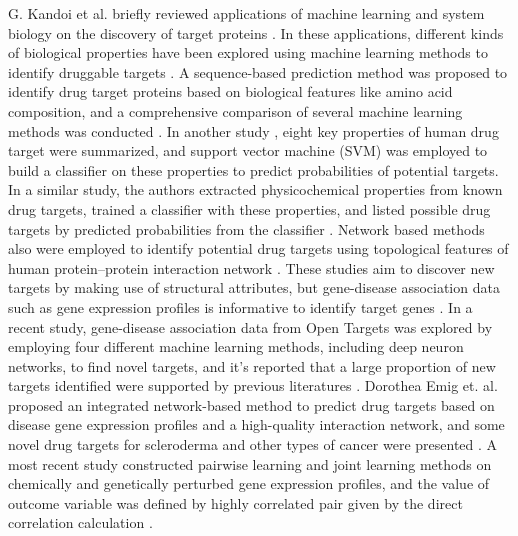     G. Kandoi et al. briefly reviewed applications of machine learning and system biology on the discovery of target proteins \cite{kandoi2015prediction}. In these applications, different kinds of biological properties have been explored using machine learning methods to identify druggable targets \cite{bakheet2009properties, fauman2011structure, li2015large,kumari2015identification, li2007prediction}. A sequence-based prediction method was proposed to identify drug target proteins based on biological features like amino acid composition, and a comprehensive comparison of several machine learning methods was conducted \cite{kumari2015identification}. In another study \cite{bakheet2009properties}, eight key properties of human drug target were summarized, and support vector machine (SVM) was employed to build a classifier on these properties to predict  probabilities of potential targets. In a similar study, the authors extracted physicochemical properties from known drug targets, trained a classifier with these properties, and listed possible drug targets by predicted probabilities from the classifier \cite{li2007prediction}. Network based methods also were employed to identify potential drug targets using topological features of human protein–protein interaction network \cite{li2015large}. These studies aim to discover new targets by making use of structural attributes, but gene-disease association data such as gene expression profiles is informative to identify target genes \cite{emig2013drug, ferrero2017silico, sawada2018predicting, costa2010machine}. In a recent study, gene-disease association data from Open Targets was explored by employing four different machine learning methods, including deep neuron networks, to find novel targets, and it’s reported that a large proportion of new targets identified were supported by previous literatures \cite{ferrero2017silico}. Dorothea Emig et. al. proposed an integrated network-based method to predict drug targets based on disease gene expression profiles and a high-quality interaction network, and some novel drug targets for scleroderma and other types of cancer were presented \cite{emig2013drug}. A most recent study constructed pairwise learning and joint learning methods on chemically and genetically perturbed gene expression profiles, and the value of outcome variable was defined by highly correlated pair given by the direct correlation calculation \cite{sawada2018predicting}. 

